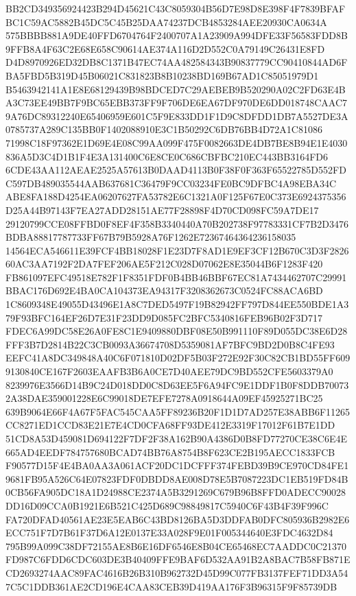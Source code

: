 \documentclass[UTF8,fontset=fandol,zihao=-4,a4paper]{ctexart}
\begin{document}
{{BB2CD349356924423B294D45621C43C8059304B56D7E98D8E398F4F7839BFAFBC1C59AC5882B45DC5C45B25DAA74237DCB4853284AEE20930CA0634A
575BBBB881A9DE40FFD6704764F2400707A1A23909A994DFE33F56583FDD8B9FFB8A4F63C2E68E658C90614AE374A116D2D552C0A79149C26431E8FD
D4D8970926ED32DB8C1371B47EC74AA482584343B90837779CC90410844AD6FBA5FBD5B319D45B06021C831823B8B10238BD169B67AD1C85051979D1
B5463942141A1E8E68129439B98BDCED7C29AEBEB9B520290A02C2FD63E4BA3C73EE49BB7F9BC65EBB373FF9F706DE6EA67DF970DE6DD018748CAAC7
9A76DC89312240E65406959E601C5F9E833DD1F1D9C8DFDD1DB7A5527DE3A0785737A289C135BB0F1402088910E3C1B50292C6DB76BB4D72A1C81086
71998C18F97362E1D69E4E08C99AA099F475F0082663DE4DB7BE8B94E1E4030836A5D3C4D1B1F4E3A131400C6E8CE0C686CBFBC210EC443BB3164FD6
6CDE43AA112AEAE2525A57613B0DAAD4113B0F38F0F363F65522785D552FDC597DB489035544AAB637681C36479F9CC03234FE0BC9DFBC4A98EBA34C
ABE8FA188D4254EA06207627FA53782E6C1321A0F125F67E0C373E6924375356D25A44B97143F7EA27ADD28151AE77F28898F4D70CD098FC59A7DE17
29120799CCE08FFBD0F8EF4F358B3340440A70B202738F97783331CF7B2D3476BDBA88817787733FF67B79B5928A76F1262E72367464364236158035
14564ECA546611E39FCF4BB18028F1E23D7F8AD1E9EF3CF12B670C3D3F282660AC3AA7192F2DA7FEF206AE5F212C028D07062E8E35044B6F1283F420
FB861097EFC49518E782F1F8351FDF0B4BB46BBF67EC81A7434462707C29991BBAC176D692E4BA0CA104373EA94317F3208362673C0524FC88ACA6BD
1C8609348E49055D43496E1A8C7DED5497F19B82942FF797D844EE550BDE1A379F93BFC164EF26D7E31F23DD9D085FC2BFC5340816FEB96B02F3D717
FDEC6A99DC58E26A0FE8C1E9409880DBF08E50B991110F89D055DC38E6D28FFF3B7D2814B22C3CB0093A36674708D5359081AF7BFC9BD2D0B8C4FE93
EEFC41A8DC349848A40C6F071810D02DF5B03F272E92F30C82CB1BD55FF6099130840CE167F2603EAAFB3B6A0CE7D40AEE79DC9BD552CFE5603379A0
8239976E3566D14B9C24D018DD0C8D63EE5F6A94FC9E1DDF1B0F8DDB700732A38DAE359001228E6C99018DE7EFE7278A0918644A09EF45925271BC25
639B9064E66F4A67F5FAC545CAA5FF89236B20F1D1D7AD257E38ABB6F11265CC8271ED1CCD83E21E7E4CD0CFA68FF93DE412E3319F17012F61B7E1DD
51CD8A53D459081D694122F7DF2F38A162B90A4386D0B8FD77270CE38C6E4E665AD4EEDF784757680BCAD74BB76A8754B8F623CE2B195AECC1833FCB
F90577D15F4E4BA0AA3A061ACF20DC1DCFFF374FEBD39B9CE970CD84FE19681FB95A526C64E07823FDF0DBDD8AE008D78E5B7087223DC1EB519FD84B
0CB56FA905DC18A1D24988CE2374A5B3291269C679B96B8FFD0ADECC90028DD16D09CCA0B1921E6B521C425D689C98849817C5940C6F43B4F39F996C
FA720DFAD40561AE23E5EAB6C43BD8126BA5D3DDFAB0DFC805936B2982E6ECC751F7D7B61F37D6A12E0137E33A028F9E01F005344640E3FDC4632D84
795B99A099C38DF72155AE8B6E16DF6546E8B04CE65468EC7AADDC0C21370FD987C6FDD6CDC603DE3B40409FFE9BAF6D532AA91B2A8BAC7B58FB871E
CD2693274AAC89FAC4616B26B310B962732D45D99C077FB3137FEF71DD3A547C5C1DDB361AE2CD196E4CAA83CEB39D419AA176F3B96315F9F85739DB
}}
\end{document}
